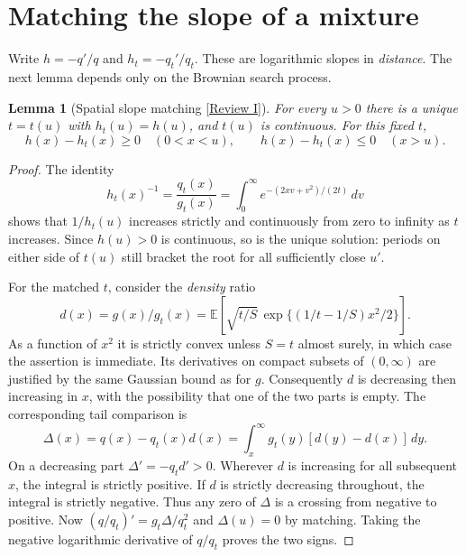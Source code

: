 \documentclass[11pt]{article}
\newcommand{\rmark}[1]{\hyperlink{reviewguide}{\textcolor{reviewblue}{\normalfont\small [Review #1]}}}
\newtheorem{lemma}[theorem]{Lemma}
\newcommand{\E}{\mathbb E}
\begin{document}
\section{Matching the slope of a mixture}
Write $h=-q'/q$ and $h_t=-q_t'/q_t$. These are logarithmic slopes in
\emph{distance}. The next lemma depends only on the Brownian search process.
\begin{lemma}[Spatial slope matching \rmark{I}]\label{lem:match}
For every $u>0$ there is a unique $t=t(u)$ with $h_t(u)=h(u)$, and
$t(u)$ is continuous. For this fixed $t$,
\[
 h(x)-h_t(x)\ge0\quad(0<x<u),\qquad
 h(x)-h_t(x)\le0\quad(x>u).
\]
\end{lemma}
\begin{proof}
The identity
\begin{equation}\label{eq:mills}
 h_t(x)^{-1}=\frac{q_t(x)}{g_t(x)}
 =\int_0^\infty e^{-(2xv+v^2)/(2t)}\,dv
\end{equation}
shows that $1/h_t(u)$ increases strictly and continuously from zero to
infinity as $t$ increases. Since $h(u)>0$ is continuous, so is the
unique solution: periods on either side of $t(u)$ still bracket the root
for all sufficiently close $u'$.

For the matched $t$, consider the \emph{density} ratio
\begin{equation}\label{eq:densityratio}
 d(x)=g(x)/g_t(x)
 =\E\!\left[\sqrt{t/S}\,\exp\{(1/t-1/S)x^2/2\}\right].
\end{equation}
As a function of $x^2$ it is strictly convex unless $S=t$ almost surely,
in which case the assertion is immediate. Its derivatives on compact subsets
of $(0,\infty)$ are justified by the same Gaussian bound as for $g$.
Consequently $d$ is decreasing
then increasing in $x$, with the possibility that one of the two parts is
empty. The corresponding tail comparison is
\begin{equation}\label{eq:delta}
 \Delta(x)=q(x)-q_t(x)d(x)
          =\int_x^\infty g_t(y)[d(y)-d(x)]\,dy .
\end{equation}
On a decreasing part $\Delta'=-q_t d'>0$. Wherever $d$ is increasing
for all subsequent $x$, the integral is strictly positive. If $d$ is
strictly decreasing throughout, the integral is strictly negative.
Thus any zero of $\Delta$ is a crossing from negative to positive.
Now $(q/q_t)'=g_t\Delta/q_t^2$ and $\Delta(u)=0$ by matching. Taking the
negative logarithmic derivative of $q/q_t$ proves the two signs.
\end{proof}
\end{document}
